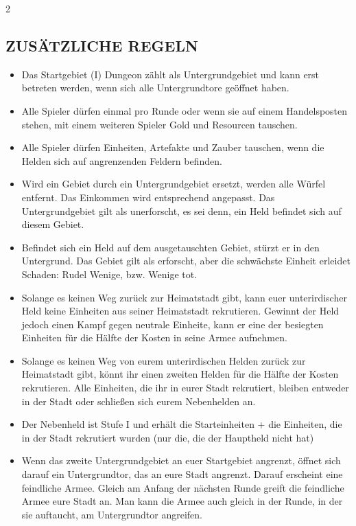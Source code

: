 \begin{multicols*}{2}
\subsection*{\MakeUppercase{Zusätzliche Regeln}} 
\begin{itemize} 
\item Das Startgebiet (I) Dungeon zählt als Untergrundgebiet und kann erst betreten werden, wenn sich alle Untergrundtore geöffnet haben.
\item Alle Spieler dürfen einmal pro Runde oder wenn sie auf einem Handelsposten stehen, mit einem weiteren Spieler Gold und Resourcen tauschen.
\item Alle Spieler dürfen Einheiten, Artefakte und Zauber tauschen, wenn die Helden sich auf angrenzenden Feldern befinden.
\item Wird ein Gebiet durch ein Untergrundgebiet ersetzt, werden alle Würfel entfernt. Das Einkommen wird entsprechend angepasst. Das Untergrundgebiet gilt als unerforscht, es sei denn, ein Held befindet sich auf diesem Gebiet. 
\item Befindet sich ein Held auf dem ausgetauschten Gebiet, stürzt er in den Untergrund. Das Gebiet gilt als erforscht, aber die schwächste Einheit erleidet Schaden: Rudel \rightarrow Wenige, bzw. Wenige \rightarrow tot. 
\item Solange es keinen Weg zurück zur Heimatstadt gibt, kann euer unterirdischer Held keine Einheiten aus seiner Heimatstadt rekrutieren. Gewinnt der Held jedoch einen Kampf gegen neutrale Einheite, kann er eine der besiegten Einheiten für die Hälfte der Kosten in seine Armee aufnehmen. 
\item Solange es keinen Weg von eurem unterirdischen Helden zurück zur Heimatstadt gibt, könnt ihr einen zweiten Helden für die Hälfte der Kosten rekrutieren. Alle Einheiten, die ihr in eurer Stadt rekrutiert, bleiben entweder in der Stadt oder schließen sich eurem Nebenhelden an. 
\item Der Nebenheld ist Stufe I und erhält die Starteinheiten + die Einheiten, die in der Stadt rekrutiert wurden (nur die, die der Hauptheld nicht hat)
\item Wenn das zweite Untergrundgebiet an euer Startgebiet angrenzt, öffnet sich darauf ein Untergrundtor, das an eure Stadt angrenzt. Darauf erscheint eine feindliche Armee. Gleich am Anfang der nächsten Runde greift die feindliche Armee eure Stadt an. Man kann die Armee auch gleich in der Runde, in der sie auftaucht, am Untergrundtor angreifen.

\end{itemize}
\end{multicols*}
